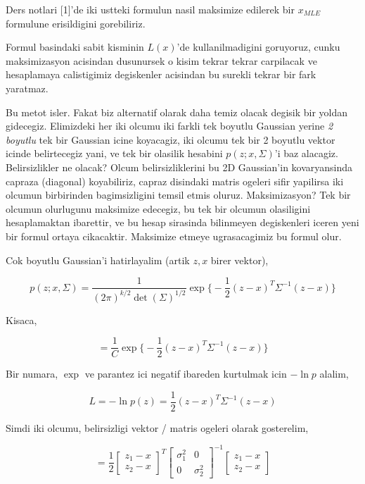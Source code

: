 \documentclass[12pt,fleqn]{article}\usepackage{../common}
\begin{document}
Ders notlari [1]'de iki ustteki formulun nasil maksimize edilerek bir
$x_{MLE}$ formulune erisildigini gorebiliriz. 

Formul basindaki sabit kisminin $L(x)$'de kullanilmadigini goruyoruz, cunku
maksimizasyon acisindan dusunursek o kisim tekrar tekrar carpilacak ve
hesaplamaya calistigimiz degiskenler acisindan bu surekli tekrar bir
fark yaratmaz.

Bu metot isler. Fakat biz alternatif olarak daha temiz olacak degisik bir
yoldan gidecegiz. Elimizdeki her iki olcumu iki farkli tek boyutlu Gaussian
yerine {\em 2 boyutlu} tek bir Gaussian icine koyacagiz, iki olcumu tek
bir 2 boyutlu vektor icinde belirtecegiz yani, ve tek bir olasilik hesabini
$p(z;x,\Sigma)$'i baz alacagiz.  Belirsizlikler ne olacak? Olcum
belirsizliklerini bu 2D Gaussian'in kovaryansinda capraza (diagonal)
koyabiliriz, capraz disindaki matris ogeleri sifir yapilirsa iki olcumun
birbirinden bagimsizligini temsil etmis oluruz. Maksimizasyon? Tek bir
olcumun olurlugunu maksimize edecegiz, bu tek bir olcumun olasiligini
hesaplamaktan ibarettir, ve bu hesap sirasinda bilinmeyen degiskenleri
iceren yeni bir formul ortaya cikacaktir. Maksimize etmeye ugrasacagimiz bu
formul olur.

Cok boyutlu Gaussian'i hatirlayalim (artik $z,x$ birer vektor),

$$ p(z;x,\Sigma) = 
\frac{ 1}{(2\pi)^{k/2} \det(\Sigma)^{1/2}} \exp 
\bigg\{ 
-\frac{ 1}{2}(z-x)^T\Sigma^{-1}(z-x)
\bigg\} $$

Kisaca,

$$ =  \frac{ 1}{C} \exp 
\bigg\{ 
-\frac{ 1}{2}(z-x)^T\Sigma^{-1}(z-x)
\bigg\} $$

Bir numara, $\exp$ ve parantez ici negatif ibareden kurtulmak icin
$-\ln p$ alalim,

$$ L = -\ln p(z) = 
\frac{ 1}{2}(z-x)^T\Sigma^{-1}(z-x)
$$

Simdi iki olcumu, belirsizligi vektor / matris ogeleri olarak gosterelim, 

$$ = \frac{1}{2}  
\left[\begin{array}{c}
z_1-x \\ z_2-x
\end{array}\right]^T
\left[\begin{array}{cc}
\sigma_1^2 & 0 \\
0 & \sigma_2^2 
\end{array}\right]^{-1}
\left[\begin{array}{c}
z_1-x \\ z_2-x
\end{array}\right]
$$
\end{document}
